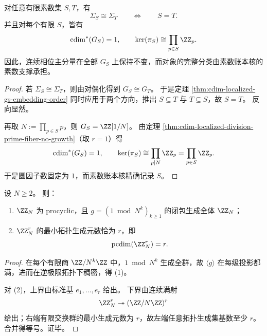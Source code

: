 \begin{corollary}[有限素支撑局部化的对偶完全分类]\label{cor:cdim-localized-gs-dual-complete-classification}
对任意有限素数集 \(S,T\)，有
\[
\Sigma_S\cong \Sigma_T
\qquad\Longleftrightarrow\qquad
S=T.
\]
并且对每个有限 \(S\)，皆有
\[
\cdim^\ast(G_S)=1,
\qquad
\ker(\pi_S)\cong \prod_{p\in S}\ZZ_p.
\]
因此，连续相位主分量在全部 \(G_S\) 上保持不变，而对象的完整分类由素数账本核的素数支撑承担。
\end{corollary}
\begin{proof}
若 \(\Sigma_S\cong \Sigma_T\)，则由对偶化得到 \(G_S\cong G_T\)。
于是定理 \ref{thm:cdim-localized-gs-embedding-order} 同时应用于两个方向，推出 \(S\subseteq T\) 与 \(T\subseteq S\)，故 \(S=T\)。
反向显然。

再取 \(N:=\prod_{p\in S}p\)，则 \(G_S=\ZZ[1/N]\)。
由定理 \ref{thm:cdim-localized-division-prime-fiber-no-growth}（取 \(r=1\)）得
\[
\cdim^\ast(G_S)=1,
\qquad
\ker(\pi_S)\cong \prod_{p\mid N}\ZZ_p=\prod_{p\in S}\ZZ_p.
\]
于是圆因子数固定为 \(1\)，而素数账本核精确记录 \(S\)。
\end{proof}

\begin{theorem}\label{thm:cdim-zn-procyclic-and-min-generators}
设 \(N\ge 2\)。
则：
\begin{enumerate}
  \item \(\ZZ_N\) 为 procyclic，且 \(g=(1\bmod N^k)_{k\ge 1}\) 的闭包生成全体 \(\ZZ_N\)；
  \item \(\ZZ_N^r\) 的最小拓扑生成元数恰为 \(r\)，即
  \[
  \pcdim(\ZZ_N^r)=r.
  \]
\end{enumerate}
\end{theorem}

\begin{proof}
在每个有限商 \(\ZZ/N^k\ZZ\) 中，\(1\bmod N^k\) 生成全群，故 \(\langle g\rangle\) 在每级投影都满，进而在逆极限拓扑下稠密，得 (1)。

对 (2)，上界由标准基 \(e_1,\dots,e_r\) 给出。
下界由连续满射
\[
\ZZ_N^r\twoheadrightarrow (\ZZ/N\ZZ)^r
\]
给出；右端有限交换群的最小生成元数为 \(r\)，故左端任意拓扑生成集基数至少 \(r\)。
合并得等号。证毕。
\end{proof}


